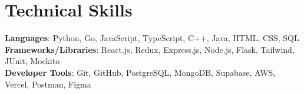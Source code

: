 \section{Technical Skills}
\begin{itemize}[leftmargin=0.15in, label={}]
    \small{\item{     
        \textbf{Languages}{: Python, Go, JavaScript, TypeScript, C++, Java, HTML, CSS, SQL} \\
     
        \textbf{Frameworks/Libraries}{: React.js, Redux, Express.js, Node.js, Flask, Tailwind, JUnit, Mockito} \\

        \textbf{Developer Tools}{: Git, GitHub, PostgreSQL, MongoDB, Supabase, AWS, Vercel, Postman, Figma} \\
    }}
\end{itemize}